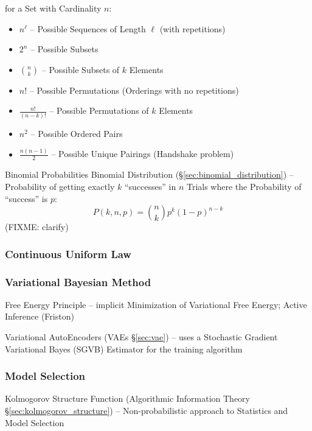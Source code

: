 for a Set with Cardinality $n$:
\begin{itemize}
  \item $n^\ell$ -- Possible Sequences of Length $\ell$ (with repetitions)
  \item $2^n$ -- Possible Subsets
  \item $\binom{n}{k}$ -- Possible Subsets of $k$ Elements
  \item $n!$ -- Possible Permutations (Orderings with no repetitions)
  \item $\frac{n!}{(n-k)!}$ -- Possible Permutations of $k$ Elements
  \item $n^2$ -- Possible Ordered Pairs
  \item $\frac{n(n-1)}{2}$ -- Possible Unique Pairings (Handshake problem)
\end{itemize}


Binomial Probabilities \fist Binomial Distribution
(\S\ref{sec:binomial_distribution}) -- Probability of getting exactly $k$
``successes'' in $n$ Trials where the Probability of ``success'' is $p$:
\[
  P(k,n,p) = \binom{n}{k}p^k(1-p)^{n-k}
\]
(FIXME: clarify)



\subsubsection{Continuous Uniform Law}\label{sec:continuous_uniform_law}

\subsubsection{Variational Bayesian Method}\label{sec:variational_bayesian}

Free Energy Principle -- implicit Minimization of Variational Free Energy;
Active Inference (Friston)

Variational AutoEncoders (VAEs \S\ref{sec:vae}) -- uses a Stochastic Gradient
Variational Bayes (SGVB) Estimator for the training algorithm



\subsubsection{Model Selection}\label{sec:model_selection}

Kolmogorov Structure Function (Algorithmic Information Theory
\S\ref{sec:kolmogorov_structure}) -- Non-probabilistic approach to Statistics
and Model Selection



